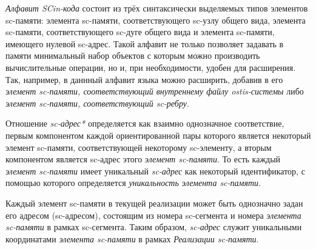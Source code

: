 \begin{SCn}
\begin{scneqtoset}
    \begin{scnindent}
    \end{scnindent}
\end{scneqtoset}
\end{SCn}

\textit{Алфавит SCin-кода\scnsupergroupsign} состоит из трёх синтаксически выделяемых типов элементов sc-памяти: элемента sc-памяти, соответствующего sc-узлу общего вида, элемента sc-памяти, соответствующего sc-дуге общего вида и элемента sc-памяти, имеющего нулевой sc-адрес. Такой алфавит не только позволяет задавать в памяти минимальный набор объектов с которым можно производить вычислительные операции, но и, при необходимости, удобен для расширения. Так, например, в даннный алфавит языка можно расширить, добавив в его \textit{элемент sc-памяти, соответствующий внутреннему файлу ostis-системы} либо \textit{элемент sc-памяти, соответствующий sc-ребру}.

\begin{SCn}
\end{SCn}

Отношение \textit{sc-адрес*} определяется как взаимно однозначное соответствие, первым компонентом каждой ориентированной пары которого является некоторый элемент sc-памяти, соответствующей некоторому sc-элементу, а вторым компонентом является sc-адрес этого \textit{элемент sc-памяти}. То есть каждый \textit{элемент sc-памяти} имеет уникальный \textit{sc-адрес} как некоторый идентификатор, с помощью которого определяется \textit{уникальность элемента sc-памяти}.

Каждый элемент sc-памяти в текущей реализации может быть однозначно задан его адресом (sc-адресом), состоящим из номера sc-сегмента и номера \textit{элемента sc-памяти} в рамках sc-сегмента. Таким образом, \textit{sc-адрес} служит уникальными координатами \textit{элемента sc-памяти} в рамках \textit{Реализации sc-памяти}.

